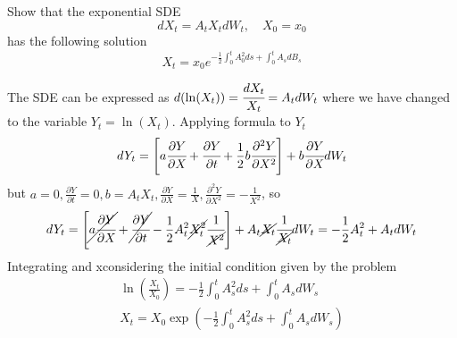 \documentclass[12pt,a4paper]{exam}
\begin{document}
\begin{questions}
\begin{solution}
\begin{solution}
\question Show that the exponential SDE
\begin{equation*}
dX_t = A_t X_tdW_t,\quad X_0=x_0
\end{equation*}
has the following solution
\begin{equation*}
X_t = x_0 e^{-\frac{1}{2}\int_0^t A_0^2 ds+\int_0^t A_s dB_s}
\end{equation*}
\fillwithlines{3cm}
\begin{solution}
The SDE can be expressed as $d(\ln(X_t)) = \cfrac{dX_t}{X_t} = A_t dW_t$ where we have changed to the variable $Y_t = \ln(X_t)$. Applying \ito formula to $Y_t$ 
\begin{equation*}
dY_t = \left[a\cfrac{\partial Y}{\partial X} + \cfrac{\partial Y}{\partial t} + \frac{1}{2}b\cfrac{\partial^2 Y}{\partial X^2}\right]+ b\cfrac{\partial Y}{\partial X}dW_t
\end{equation*}
but $a=0, \frac{\partial Y}{\partial t}=0, b=A_tX_t, \frac{\partial Y}{\partial X}=\frac{1}{X}, \frac{\partial^2 Y}{\partial X^2}=-\frac{1}{X^2}$, so
\begin{equation*}
dY_t = \left[\cancel{a\cfrac{\partial Y}{\partial X}} + \cancel{\cfrac{\partial Y}{\partial t}} - \frac{1}{2}A_t^2 \cancel{X_t^2}\cfrac{1}{\cancel{X^2}}\right]+ A_t\cancel{X_t}\cfrac{1}{\cancel{X_t}}dW_t = -\frac{1}{2}A_t^2 + A_t dW_t
\end{equation*}
Integrating and xconsidering the initial condition given by the problem
\begin{equation*}
\begin{gathered}
\ln\left(\frac{X_t}{X_0}\right) = -\frac{1}{2}\int_0^t A_s^2 ds + \int_0^tA_s dW_s \\
X_t = X_0 \exp\left(-\frac{1}{2}\int_0^t A_s^2 ds + \int_0^tA_s dW_s \right)
\end{gathered}
\end{equation*}
%
%
%
%
%
%
%
%
%
%
%
%
\end{solution}


\end{solution}
\end{solution}
\end{questions}
\end{document}
